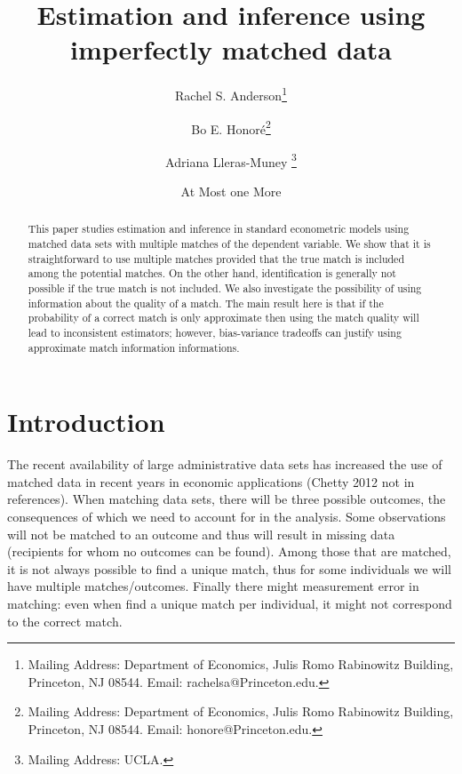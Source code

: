 \documentclass[12pt]{article}
\begin{document}
\author{Rachel S. Anderson\thanks{%
Mailing Address: Department of Economics, Julis Romo Rabinowitz Building,
Princeton, NJ 08544. Email: rachelsa@Princeton.edu.} \and Bo E. Honor\'{e}\thanks{%
Mailing Address: Department of Economics, Julis Romo Rabinowitz Building,
Princeton, NJ 08544. Email: honore@Princeton.edu.} \and Adriana Lleras-Muney%
\thanks{%
Mailing Address: UCLA.} \and At Most one More}
\title{Estimation and inference using imperfectly matched data}
\maketitle

\begin{abstract}
\singlespacing
This paper studies estimation and inference in standard econometric models
using matched data sets with multiple matches of the dependent variable.
We show that it is straightforward to use multiple matches provided that the
true match is included among the potential matches. On the other hand,
identification is generally not possible if the true match is not included.
We also investigate the possibility of using information about the quality
of a match. The main result here is that if the probability of a correct
match is only approximate then using the match quality will lead to
inconsistent estimators; however, bias-variance
tradeoffs can justify using approximate match information informations.
\end{abstract}


\section{Introduction}

The recent availability of large administrative data sets has increased the
use of matched data in recent years in economic applications (Chetty 2012
not in references). When matching data sets, there will be three possible
outcomes, the consequences of which we need to account for in the analysis.
Some observations will not be matched to an outcome and thus will result in
missing data (recipients for whom no outcomes can be found). Among those
that are matched, it is not always possible to find a unique match, thus for
some individuals we will have multiple matches/outcomes. Finally there might
measurement error in matching: even when find a unique match per individual,
it might not correspond to the correct match.
\end{document}
